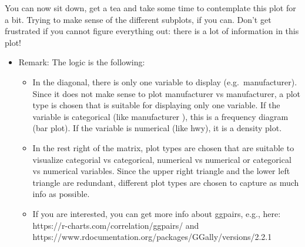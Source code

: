 \documentclass[
  letterpaper,
  DIV=11,
  numbers=noendperiod]{scrartcl}
\begin{document}
You can now sit down, get a tea and take some time to contemplate this
plot for a bit. Trying to make sense of the different subplots, if you
can. Don't get frustrated if you cannot figure everything out: there is
a lot of information in this plot!

\begin{itemize}
\item
  Remark: The logic is the following:

  \begin{itemize}
  \item
    In the diagonal, there is only one variable to display
    (e.g.~manufacturer). Since it does not make sense to plot
    manufacturer vs manufacturer, a plot type is chosen that is suitable
    for displaying only one variable. If the variable is categorical
    (like manufacturer ), this is a frequency diagram (bar plot). If the
    variable is numerical (like hwy), it is a density plot.
  \item
    In the rest right of the matrix, plot types are chosen that are
    suitable to visualize categorial vs categorical, numerical vs
    numerical or categorical vs numerical variables. Since the upper
    right triangle and the lower left triangle are redundant, different
    plot types are chosen to capture as much info as possible.
  \item
    If you are interested, you can get more info about ggpairs, e.g.,
    here: https://r-charts.com/correlation/ggpairs/ and
    https://www.rdocumentation.org/packages/GGally/versions/2.2.1
  \end{itemize}
\end{itemize}
\end{document}
